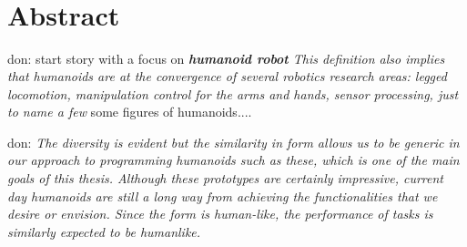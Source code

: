 \documentclass[a4paper, 11pt, oneside]{Thesis}
\begin{document}

\frontmatter      %


\fancyhead{}  %
\rhead{\thepage}  %
\lhead{}  %

\pagestyle{fancy}  %

\clearpage




%
%


{\color{red}\section*{\huge {}\\}} %

{\color{blue}\section*{\huge Abstract}}

don: start story with a focus on \textit{\textbf{humanoid robot} This definition also implies that humanoids are at the convergence of several robotics research areas: legged locomotion, manipulation control for the arms and hands, sensor processing, just to name a few} some figures of humanoids.... 

don: \textit{The diversity is evident but the similarity in form allows us to be generic in our approach to programming humanoids such as these, which is one of the main goals of this thesis. Although these prototypes are certainly impressive, current day humanoids are still
a long way from achieving the functionalities that we desire or envision. Since the
form is human-like, the performance of tasks is similarly expected to be humanlike. }
\end{document}
